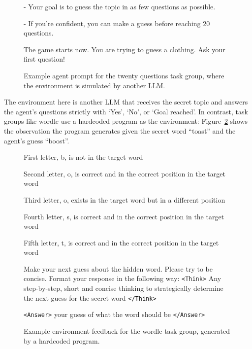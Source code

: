 \documentclass[manuscript,review]{acmart}
\begin{document}
{{\begin{figure}[H]
\begin{tcolorbox}[colback=gray!20, colframe=black, title=Twenty Questions Agent Prompt]
- Your goal is to guess the topic in as few questions as possible.

- If you're confident, you can make a guess before reaching 20 questions.

The game starts now. You are trying to guess a clothing. Ask your first question!
\end{tcolorbox}
\caption{Example agent prompt for the twenty questions task group, where the environment
is simulated by another LLM.}
\label{fig:twenty_questions_prompt}
\end{figure}

The environment here is another LLM that receives the secret topic and answers the
agent's questions strictly with `Yes', `No', or `Goal reached'. In contrast, task groups
like wordle use a hardcoded program as the environment:
Figure~\ref{fig:wordle_feedback} shows the observation the program generates given the
secret word ``toast'' and the agent's guess ``boost''.

\begin{figure}[H]
\begin{tcolorbox}[colback=gray!20, colframe=black, title=Wordle Task Environment Feedback]
First letter, b, is not in the target word

Second letter, o, is correct and in the correct position in the target word

Third letter, o, exists in the target word but in a different position

Fourth letter, s, is correct and in the correct position in the target word

Fifth letter, t, is correct and in the correct position in the target word

Make your next guess about the hidden word. Please try to be concise. Format your
response in the following way: \texttt{<Think>} Any step-by-step, short and concise
thinking to strategically determine the next guess for the secret word \texttt{</Think>}

\texttt{<Answer>} your guess of what the word should be \texttt{</Answer>}
\end{tcolorbox}
\caption{Example environment feedback for the wordle task group, generated by a
hardcoded program.}
\label{fig:wordle_feedback}
\end{figure}
}

}
\end{document}
